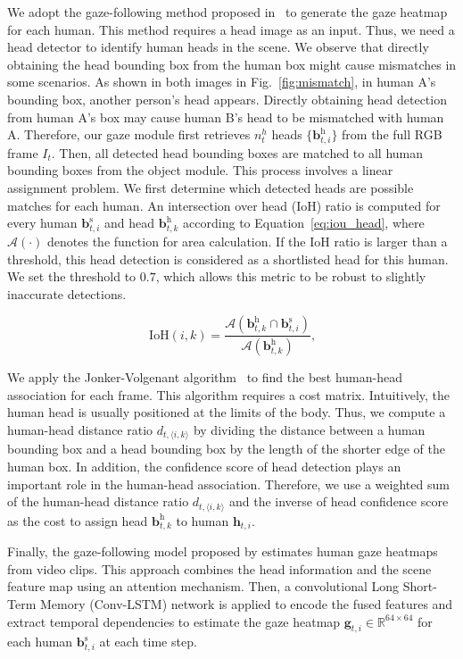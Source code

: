\documentclass[times,twocolumn,final,authoryear]{elsarticle}
\begin{document}
We adopt the gaze-following method proposed in~\citep{gaze:detecting_attended} to generate the gaze heatmap for each human. This method requires a head image as an input. Thus, we need a head detector to identify human heads in the scene. We observe that directly obtaining the head bounding box from the human box might cause mismatches in some scenarios. As shown in both images in Fig.~\ref{fig:mismatch}, in human A's bounding box, another person's head appears. Directly obtaining head detection from human A's box may cause human B's head to be mismatched with human A. Therefore, our gaze module first retrieves $n_t^{h}$ heads $\{\mathbf{b}_{t,i}^\text{h}\}$ from the full RGB frame $I_t$. Then, all detected head bounding boxes are matched to all human bounding boxes from the object module. This process involves a linear assignment problem. We first determine which detected heads are possible matches for each human. An intersection over head (IoH) ratio is computed for every human $\mathbf{b}_{t,i}^\text{s}$ and head $\mathbf{b}_{t,k}^\text{h}$ according to Equation~\ref{eq:iou_head}, where $\mathcal{A}(\cdot)$ denotes the function for area calculation. If the IoH ratio is larger than a threshold, this head detection is considered as a shortlisted head for this human. We set the threshold to $0.7$, which allows this metric to be robust to slightly inaccurate detections. 

\begin{equation}
   \text{IoH}(i, k)=\frac{\mathcal{A}(\mathbf{b}_{t,k}^\text{h} \cap \mathbf{b}_{t,i}^\text{s})}{\mathcal{A}(\mathbf{b}_{t,k}^\text{h})}\text{,}
   \label{eq:iou_head}
\end{equation}

We apply the Jonker-Volgenant algorithm~\citep{assignment:jonker, assignment:new} to find the best human-head association for each frame. This algorithm requires a cost matrix. Intuitively, the human head is usually positioned at the limits of the body. Thus, we compute a human-head distance ratio $d_{t, \langle i, k\rangle}$ by dividing the distance between a human bounding box and a head bounding box by the length of the shorter edge of the human box. In addition, the confidence score of head detection plays an important role in the human-head association. Therefore, we use a weighted sum of the human-head distance ratio $d_{t, \langle i, k\rangle}$ and the inverse of head confidence score as the cost to assign head $\mathbf{b}_{t,k}^\text{h}$ to human $\mathbf{h}_{t,i}$. 

Finally, the gaze-following model proposed by \citet{gaze:detecting_attended} estimates human gaze heatmaps from video clips. This approach combines the head information and the scene feature map using an attention mechanism. Then, a convolutional Long Short-Term Memory (Conv-LSTM) network is applied to encode the fused features and extract temporal dependencies to estimate the gaze heatmap $\mathbf{g}_{t,i} \in \mathbb{R}^{64 \times 64}$ for each human $\mathbf{b}_{t,i}^\text{s}$ at each time step.
\end{document}
